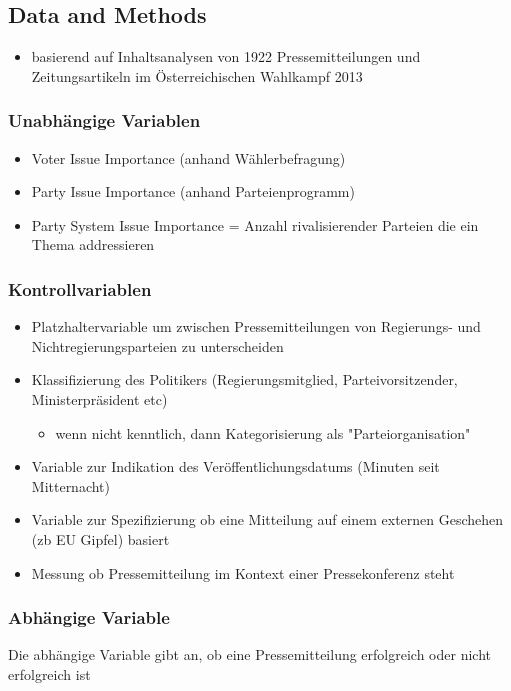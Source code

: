 \documentclass[11pt]{article}
\begin{document}
\subsection{Data and Methods}
\label{sec:org78682d8}
\begin{itemize}
\item basierend auf Inhaltsanalysen von 1922 Pressemitteilungen und Zeitungsartikeln im Österreichischen Wahlkampf 2013
\end{itemize}

\subsubsection{Unabhängige Variablen}
\label{sec:orgc5aa25e}
\begin{itemize}
\item Voter Issue Importance (anhand Wählerbefragung)
\item Party Issue Importance (anhand Parteienprogramm)
\item Party System Issue Importance = Anzahl rivalisierender Parteien die ein Thema addressieren
\end{itemize}

\subsubsection{Kontrollvariablen}
\label{sec:orgea3e92f}
\begin{itemize}
\item Platzhaltervariable um zwischen Pressemitteilungen von Regierungs- und Nichtregierungsparteien zu unterscheiden
\item Klassifizierung des Politikers (Regierungsmitglied, Parteivorsitzender, Ministerpräsident etc)
\begin{itemize}
\item wenn nicht kenntlich, dann Kategorisierung als "Parteiorganisation"
\end{itemize}
\item Variable zur Indikation des Veröffentlichungsdatums (Minuten seit Mitternacht)
\item Variable zur Spezifizierung ob eine Mitteilung auf einem externen Geschehen (zb EU Gipfel) basiert
\item Messung ob Pressemitteilung im Kontext einer Pressekonferenz steht
\end{itemize}

\subsubsection{Abhängige Variable}
\label{sec:org530fb9d}
Die abhängige Variable gibt an, ob eine Pressemitteilung erfolgreich oder nicht erfolgreich ist
\end{document}
